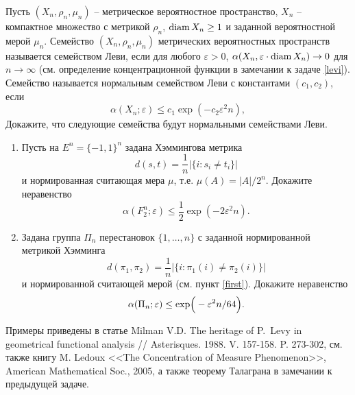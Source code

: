 \begin{problem}[Семейства Леви] 
Пусть  $(X_n,\rho_n,\mu_n)$  -- метрическое вероятностное пространство, $X_n$ -- компактное множество с метрикой $\rho_n$, $ \operatorname{diam} X_n\geq 1$ и заданной вероятностной мерой $\mu_n$. Семейство  $(X_n,\rho_n,\mu_n)$ метрических вероятностных пространств называется семейством Леви, если для любого $\varepsilon>0$, $\alpha(X_n,\varepsilon \cdot \operatorname{diam} X_n) \to 0$ для $n\to \infty$ (см. определение концентрационной функции в замечании к задаче \ref{levi}).  Семейство называется нормальным семейством Леви с константами $(c_1,c_2)$, если
\begin{equation*}
\alpha(X_n;\varepsilon) \leq c_1 \exp(-c_2\varepsilon^2 n),
\end{equation*}
Докажите, что следующие семейства будут нормальными семействами Леви.
\begin{enumerate} 
\item \label{first} Пусть на $E^n = \{-1,1\}^n$  задана Хэммингова метрика 
\begin{equation*}
d(s,t) = \frac{1}{n} |\{i:s_i\not=t_i\}|
\end{equation*}
и нормированная считающая мера $\mu$, т.е. $\mu(A) = |A|/2^n$. Докажите неравенство 
\begin{equation*}
\alpha(F_2^n;\varepsilon) \leq \frac{1}{2}\exp(-2\varepsilon^2 n).
\end{equation*}
\item 
Задана группа $\Pi_n$ перестановок $\{1,\dots,n\}$ с заданной нормированной метрикой Хэмминга 
\begin{equation*}
d(\pi_1,\pi_2) = \frac{1}{n} |\{i:\pi_1(i)\not=\pi_2(i)\}|
\end{equation*}
 и нормированной считающей мерой (см. пункт \ref{first}). Докажите неравенство 
\begin{equation*}
\alpha(\Pi_n;\varepsilon) \leq \exp\Bigr(-\varepsilon^2n/64\Bigl).
\end{equation*}
\end{enumerate}
\end{problem}
\begin{remark}
Примеры приведены в статье  Milman V.D. The heritage of P.~Levy in geometrical functional analysis // Asterisques. 1988. V. 157-158. P. 273-302, см. также книгу M. Ledoux <<The Concentration of Measure Phenomenon>>, American Mathematical Soc., 2005, а также теорему Талаграна в замечании к предыдущей задаче.

\end{remark}

